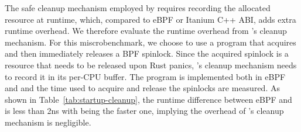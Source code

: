 The safe cleanup mechanism employed by \projname{} requires recording the allocated
    resource at runtime, which, compared to eBPF or Itanium C++ ABI, adds extra
    runtime overhead.
We therefore evaluate the runtime overhead from \projname{}'s cleanup
    mechanism.
For this miscrobenchmark, we choose to use a program that acquires and then
    immediately releases a BPF spinlock.
Since the acquired spinlock is a resource that needs to be released upon Rust
    panics, \projname{}'s cleanup mechanism needs to record it in its per-CPU
    buffer.
The program is implemented both in eBPF and \projname{} and the time used to
    acquire and release the spinlocks are measured.
As shown in Table~\ref{tab:startup-cleanup}, the runtime difference between
    eBPF and \projname{} is less than 2ns with \projname{} being the faster
    one, implying the overhead of \projname{}'s cleanup mechanism is
    negligible.

